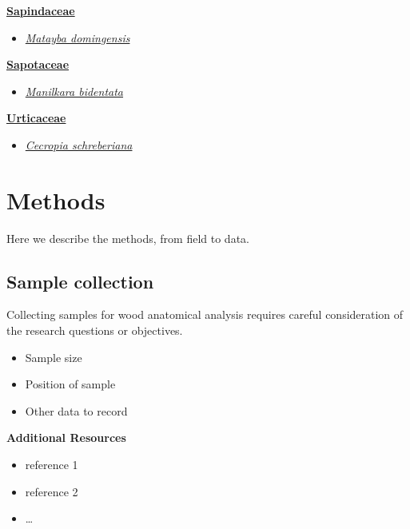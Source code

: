 \documentclass[
]{book}
\providecommand{\tightlist}{%
  \setlength{\itemsep}{0pt}\setlength{\parskip}{0pt}}
\begin{document}
\textbf{\protect\hyperlink{sapindaceae}{Sapindaceae}}

\begin{itemize}
\tightlist
\item
  \protect\hyperlink{matayba-domingensis}{\emph{Matayba domingensis}}
\end{itemize}

\textbf{\protect\hyperlink{sapotaceae}{Sapotaceae}}

\begin{itemize}
\tightlist
\item
  \protect\hyperlink{manilkara-bidentata}{\emph{Manilkara bidentata}}
\end{itemize}

\textbf{\protect\hyperlink{urticaceae}{Urticaceae}}

\begin{itemize}
\tightlist
\item
  \protect\hyperlink{cecropia-schreberiana}{\emph{Cecropia schreberiana}}
\end{itemize}

\hypertarget{methods}{%
\chapter*{Methods}\label{methods}}

Here we describe the methods, from field to data.

\hypertarget{sample-collection}{%
\section*{Sample collection}\label{sample-collection}}

Collecting samples for wood anatomical analysis requires careful consideration of the research questions or objectives.

\begin{itemize}
\tightlist
\item
  Sample size
\item
  Position of sample
\item
  Other data to record
\end{itemize}

\textbf{Additional Resources}

\begin{itemize}
\tightlist
\item
  reference 1
\item
  reference 2
\item
  \ldots{}
\end{itemize}
\end{document}
